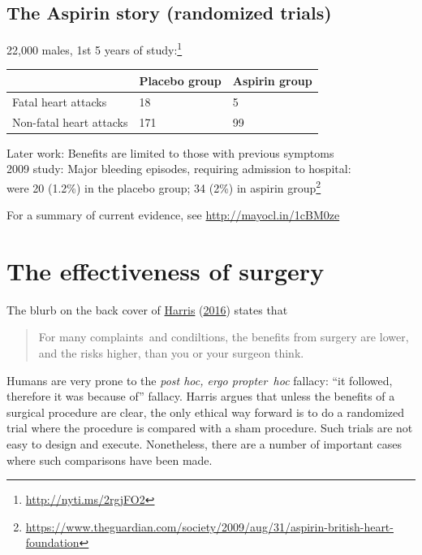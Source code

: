 \documentclass[
  10pt,
  b5paper]{book}
\begin{document}
\hypertarget{the-aspirin-story-randomized-trials}{%
\subsection*{The Aspirin story (randomized trials)}\label{the-aspirin-story-randomized-trials}}

22,000 males, 1st 5 years of study:\footnote{\url{http://nyti.ms/2rgjFO2}}

\begin{longtable}[]{@{}lll@{}}
\toprule
& Placebo group & Aspirin group \\
\midrule
\endhead
Fatal heart attacks & 18 & 5 \\
Non-fatal heart attacks & 171 & 99 \\
\bottomrule
\end{longtable}

Later work: Benefits are limited to those with previous symptoms\\
2009 study: Major bleeding episodes, requiring admission to hospital:\\
were 20 (1.2\%) in the placebo group; 34 (2\%) in aspirin group\footnote{\url{https://www.theguardian.com/society/2009/aug/31/aspirin-british-heart-foundation}}

For a summary of current evidence, see \url{http://mayocl.in/1cBM0ze}

\hypertarget{the-effectiveness-of-surgery}{%
\section{The effectiveness of surgery}\label{the-effectiveness-of-surgery}}

The blurb on the back cover of \protect\hyperlink{ref-harris2016book}{Harris} (\protect\hyperlink{ref-harris2016book}{2016}) states that

\begin{quote}
For many complaints~and condiltions, the benefits from surgery
are lower, and the risks higher, than you or your surgeon think.
\end{quote}

Humans are very prone to the \emph{post hoc, ergo propter~hoc} fallacy:
``it followed, therefore it was because of'' fallacy. Harris
argues that unless the benefits of a surgical procedure are clear,
the only ethical way forward is to do a randomized trial where
the procedure is compared with a sham procedure. Such trials
are not easy to design and execute. Nonetheless, there are a
number of important cases where such comparisons have been made.
\end{document}
